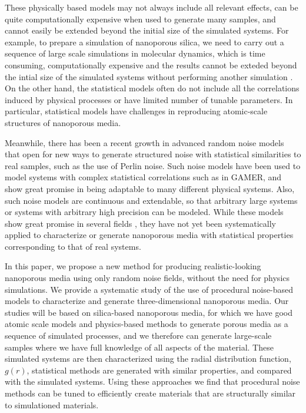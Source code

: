 \documentclass[aps,pre,twocolumn,letterpaper,floatfix,showpacs]{revtex4}
\begin{document}
These physically based models may not always include all relevant effects, can be quite
computationally expensive when used to generate many samples, and cannot easily be extended
beyond the initial size of the simulated systems. 
For example, to prepare a simulation of nanoporous silica, we need to carry out a sequence
of large scale simulations in molecular dynamics, which is time consuming, computationally
expensive and the results cannot be exteded beyond the intial size of the simulated systems
without performing another simulation \cite{Adarsh}. 
On the other hand, the statistical models often do not include all the correlations induced
by physical processes or have limited number of tunable parameters. 
In particular, statistical models have challenges in reproducing atomic-scale structures of nanoporous media. 


Meanwhile, there has been a recent growth in advanced random noise models that open for new
ways to generate structured noise with statistical similarities to real samples, such as the use of Perlin noise. 
Such noise models have been used to model systems with complex statistical correlations such
as in GAMER\cite{groeneboom:2014}, and show great promise in being adaptable to many different physical systems. 
Also, such noise models are continuous and extendable, so that arbitrary large systems or
systems with arbitrary high precision can be modeled. 
While these models show great promise in several fields \cite{ebert2003texturing, cook2005wavelet, bridson2007curl, goldberg2008anisotropic},
they have not yet been systematically applied to characterize or generate nanoporous media with statistical properties corresponding to that of real systems.

In this paper, we propose a new method for producing realistic-looking nanoporous media
using only random noise fields, without the need for physics simulations. 
We provide a systematic study of the use of procedural noise-based models to characterize
and generate three-dimensional nanoporous media. 
Our studies will be based on silica-based nanoporous media, for which we have good atomic
scale models and physics-based methods to generate porous media as a sequence of simulated
processes, and we therefore can generate large-scale samples where we have full knowledge of all aspects of the material. 
These simulated systems are then characterized using the radial distribution function, $g(r)$,
statistical methods are generated with similar properties, and compared with the simulated systems. 
Using these approaches we find that procedural noise methods can be tuned to efficiently create
materials that are structurally similar to simulationed materials. 
\end{document}
